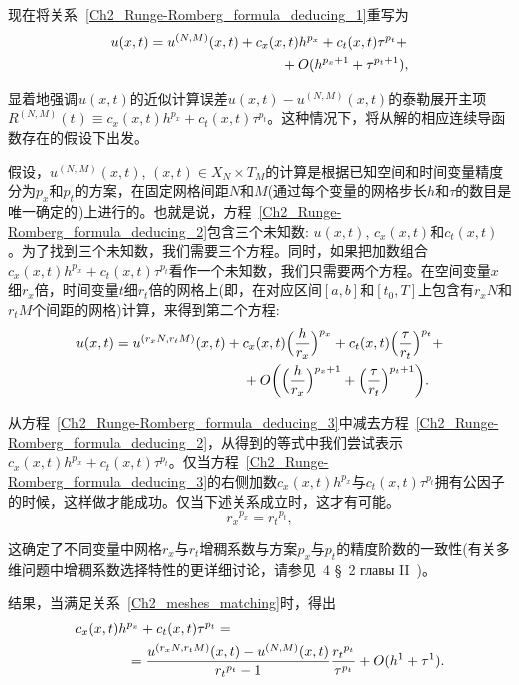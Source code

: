\documentclass[twoside]{book}
\begin{document}
\begin{CJK*}{GBK}{song}
	现在将关系~\eqref{Ch2_Runge-Romberg_formula_deducing_1}重写为
	\begin{align}
	&u(x,t) = u^{(N,M)}(x,t) + c_x(x,t) h^{p_x} + c_t(x,t) \tau^{p_t} + \notag \\
	&\hspace{+4.3cm}+ O(h^{p_x + 1} + \tau^{p_t + 1}), \label{Ch2_Runge-Romberg_formula_deducing_2}
	\end{align}
	
	显着地强调$u(x,t)$的近似计算误差$u(x,t) - u^{(N,M)}(x,t)$的泰勒展开主项$R^{(N,M)}(t) \equiv c_x(x,t) h^{p_x} + c_t(x,t) \tau^{p_t}$。这种情况下，将从解的相应连续导函数存在的假设下出发。

	假设，$u^{(N,M)}(x,t)$, $(x,t) \in X_N \times T_M$的计算是根据已知空间和时间变量精度分为$p_x$和$p_t$的方案，在固定网格间距$N$和$M$(通过每个变量的网格步长$h$和$\tau$的数目是唯一确定的)上进行的。也就是说，方程~\eqref{Ch2_Runge-Romberg_formula_deducing_2}包含三个未知数: $u(x,t)$, $c_x(x,t)$和$c_t(x,t)$。为了找到三个未知数，我们需要三个方程。同时，如果把加数组合$c_x(x,t) h^{p_x} + c_t(x,t) \tau^{p_t}$看作一个未知数，我们只需要两个方程。在空间变量$x$细$r_x$倍，时间变量$t$细$r_t$倍的网格上(即，在对应区间$[a,b]$和$[t_0,T]$上包含有$r_x N$和$r_t M$个间距的网格)计算，来得到第二个方程:
	\begin{align}
	&u(x,t) = u^{(r_x N,r_t M)}(x,t) + c_x(x,t) \Big(\frac{h}{r_x}\Big)^{p_x} +  c_t(x,t) \Big(\frac{\tau}{r_t}\Big)^{p_t} + \notag \\
	&\hspace{+4.2cm} + O\bigg(\Big(\frac{h}{r_x}\Big)^{p_x + 1} + \Big(\frac{\tau}{r_t}\Big)^{p_t + 1}\bigg).\label{Ch2_Runge-Romberg_formula_deducing_3}
	\end{align}
	
	从方程~\eqref{Ch2_Runge-Romberg_formula_deducing_3}中减去方程~\eqref{Ch2_Runge-Romberg_formula_deducing_2}，从得到的等式中我们尝试表示$c_x(x,t) h^{p_x} + c_t(x,t) \tau^{p_t}$。仅当方程~\eqref{Ch2_Runge-Romberg_formula_deducing_3}的右侧加数$c_x(x,t) h^{p_x}$与$c_t(x,t) \tau^{p_t}$拥有公因子的时候，这样做才能成功。仅当下述关系成立时，这才有可能。
	\begin{equation}
	\label{Ch2_meshes_matching}
	{r_x}^{p_x} = {r_t}^{p_t},
	\end{equation}
	
	这确定了不同变量中网格$r_x$与$r_t$增稠系数与方案$p_x$与$p_t$的精度阶数的一致性(有关多维问题中增稠系数选择特性的更详细讨论，请参见~4 \S~2 главы II~\cite{Kalitkin_book_3})。
	
	结果，当满足关系~\eqref{Ch2_meshes_matching}时，得出
	\begin{align}
	&c_x(x,t) h^{p_x} + c_t(x,t) \tau^{p_t} = \notag\\
	&\hspace{+1.3cm} = \frac{u^{(r_x N,r_t M)}(x,t) - u^{(N,M)}(x,t)}{{r_t}^{p_t} - 1}\frac{{r_t}^{p_t}}{\tau^{p_t}} + O(h^1 + \tau^1). \label{Ch2_Runge-Romberg_formula_deducing_4}
	\end{align}
	

\end{CJK*}
\end{document}

